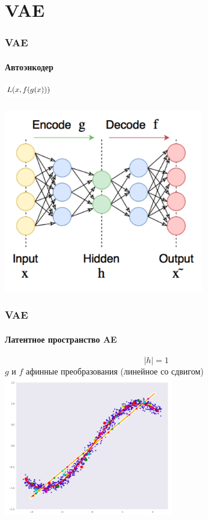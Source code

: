 \documentclass[10pt]{beamer}
\begin{document}
\section{VAE}
\begin{frame}
\frametitle{VAE}
\framesubtitle{Автоэнкодер}

\begin{center}
    \includegraphics[width=0.15\textwidth]{images/ae_term.png} \\
    \vskip-5mm \\
    \includegraphics[width=0.65\textwidth]{images/ae.png}
\end{center}

\end{frame}
\begin{frame}
\frametitle{VAE}
\framesubtitle{Латентное пространство AE}

\begin{center}
    $$|h| = 1$$
    $g$ и $f$ афинные преобразования (линейное со сдвигом)
    \includegraphics[width=0.55\textwidth]{images/ae_lin.png}
\end{center}

\end{frame}
\end{document}
